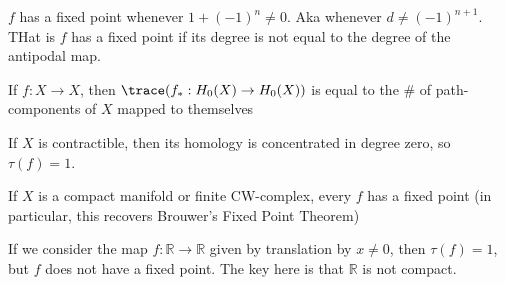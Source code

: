 \begin{corollary}
	$f$ has a fixed point whenever $1 + (-1)^n \neq 0$. Aka whenever $d \neq (-1)^{n + 1}$. THat is $f$ has a fixed point if its degree is not equal to the degree of the antipodal map.
\end{corollary}

\begin{exercise}
	If $f : X \to X$, then $\trace(f_\ast : H_0(X) \to H_0(X))$ is equal to the \# of path-components of $X$ mapped to themselves
\end{exercise}

\begin{exercise}
	If $X$ is contractible, then its homology is concentrated in degree zero, so $\tau(f) = 1$.

	If $X$ is a compact manifold or finite CW-complex, every $f$ has a fixed point (in particular, this recovers Brouwer's Fixed Point Theorem)
\end{exercise}

\begin{eg}
	If we consider the map $f : \mathbb{R} \to \mathbb{R}$ given by translation by $x \neq 0$, then $\tau(f) = 1$, but $f$ does not have a fixed point. The key here is that $\mathbb{R}$ is not compact.
\end{eg}